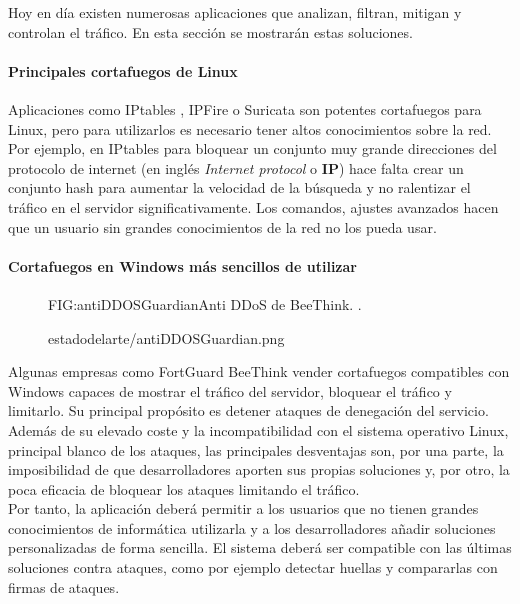 Hoy en día existen numerosas aplicaciones que analizan, filtran, mitigan y controlan el tráfico. En esta sección se mostrarán estas soluciones.

\paragraph{Principales cortafuegos de Linux}
Aplicaciones como IPtables \cite{iptablesbook}, IPFire \cite{theipfire} o Suricata \cite{suricataex} son potentes cortafuegos para Linux, pero para utilizarlos es necesario tener altos conocimientos sobre la red. Por ejemplo, en IPtables para bloquear un conjunto muy grande direcciones del protocolo de internet  (en inglés\textit{ Internet protocol }o \textbf{IP})  hace falta crear un conjunto hash \cite{ipsetadv} para aumentar la velocidad de la búsqueda y no ralentizar el tráfico en el servidor significativamente. Los comandos, ajustes avanzados hacen que un usuario sin grandes conocimientos de la red no los pueda usar.

\paragraph{Cortafuegos en Windows más sencillos de utilizar}



\begin{figure}[Anti DDoS de BeeThink.]{FIG:antiDDOSGuardian}{Anti DDoS de BeeThink. \cite{antiDDOSGuardian}.}
  \begin{image}{}{}{estadodelarte/antiDDOSGuardian.png}
  \end{image}
\end{figure}

Algunas empresas como FortGuard \cite{FortGuard} BeeThink \cite{antiDDOSGuardian} vender cortafuegos compatibles con Windows capaces de mostrar el tráfico del servidor, bloquear el tráfico y limitarlo. Su principal propósito es detener ataques de denegación del servicio. Además de su elevado coste y la incompatibilidad con el sistema operativo Linux, principal blanco de los ataques, las principales desventajas son, por una parte, la imposibilidad de que desarrolladores aporten sus propias soluciones y, por otro, la poca eficacia de bloquear los ataques limitando el tráfico.
\\Por tanto, la aplicación deberá permitir a los usuarios que no tienen grandes conocimientos de informática utilizarla y a los desarrolladores añadir soluciones personalizadas de forma sencilla. El sistema deberá ser compatible con las últimas soluciones contra ataques, como por ejemplo detectar huellas y compararlas con firmas de ataques.